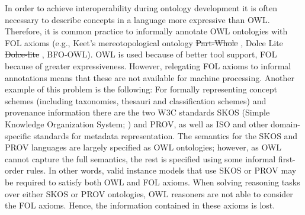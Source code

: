 \documentclass[10pt,fleqn,final]{scrreprt}
\newcommand{\noterefname}{note}
\newcommand{\nref}[1]{\noterefname~\ref{#1}}
\renewcommand{\nref}[1]{\ref{nref-#1}} %
\newenvironment{definitions}[0]{\medskip }{}
\providecommand{\DIFadd}[1]{{\protect\color{blue}\uwave{#1}}} %
\providecommand{\DIFdel}[1]{{\protect\color{red}\sout{#1}}}                      %
\providecommand{\DIFaddbegin}{} %
\providecommand{\DIFaddend}{} %
\providecommand{\DIFdelbegin}{} %
\providecommand{\DIFdelend}{} %
\begin{document}
\begin{definitions}
In order to achieve interoperability during ontology development it is often necessary to describe 
concepts in a language more expressive than OWL.  Therefore, it is common practice to informally 
annotate OWL ontologies with FOL axioms (e.g., Keet's mereotopological ontology \DIFdelbegin %
\DIFdel{Part-Whole}%
\DIFdelend \DIFaddbegin \DIFadd{\mbox{%
\cite{KeetEtAl12}
}%
}\DIFaddend , 
Dolce Lite \DIFdelbegin %
\DIFdel{Dolce-lite}%
\DIFdelend \DIFaddbegin \DIFadd{\mbox{%
\cite{dolce-web}
}%
}\DIFaddend , BFO-OWL). OWL is used because of better tool support, FOL because of 
greater expressiveness. However, relegating FOL axioms to  informal annotations means that these 
are not available for machine processing.  Another example of this problem is the following: For 
formally representing concept schemes (including taxonomies, thesauri and classification schemes) 
and provenance information there are the two W3C standards SKOS (Simple Knowledge Organization 
System; \DIFdelbegin %
\DIFdelend \DIFaddbegin \DIFadd{\nref{SKOS}}\DIFaddend ) and PROV, as well as ISO and other domain-specific  standards for 
metadata representation. The semantics for the SKOS and PROV languages are largely specified as OWL 
ontologies; however, as OWL cannot capture the full semantics, the rest is specified using some 
informal first-order rules. In other words, valid instance models that use SKOS or PROV may be 
required to satisfy both OWL and FOL axioms. When solving reasoning tasks over either SKOS or PROV 
ontologies, OWL reasoners are not able to consider the  FOL axioms. Hence, the information 
contained in these axioms is lost.


\end{definitions}
\end{document}

